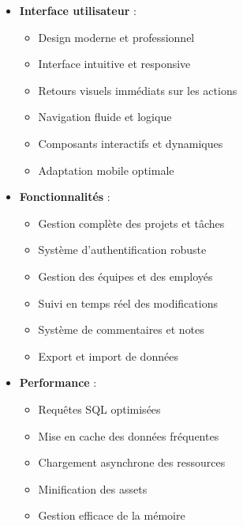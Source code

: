\documentclass[12pt,a4paper]{article}
\begin{document}
\begin{itemize}
    \item \textbf{Interface utilisateur} :
    \begin{itemize}
        \item Design moderne et professionnel
        \item Interface intuitive et responsive
        \item Retours visuels immédiats sur les actions
        \item Navigation fluide et logique
        \item Composants interactifs et dynamiques
        \item Adaptation mobile optimale
    \end{itemize}

    \item \textbf{Fonctionnalités} :
    \begin{itemize}
        \item Gestion complète des projets et tâches
        \item Système d'authentification robuste
        \item Gestion des équipes et des employés
        \item Suivi en temps réel des modifications
        \item Système de commentaires et notes
        \item Export et import de données
    \end{itemize}

    \item \textbf{Performance} :
    \begin{itemize}
        \item Requêtes SQL optimisées
        \item Mise en cache des données fréquentes
        \item Chargement asynchrone des ressources
        \item Minification des assets
        \item Gestion efficace de la mémoire
    \end{itemize}
\end{itemize}
\end{document}
